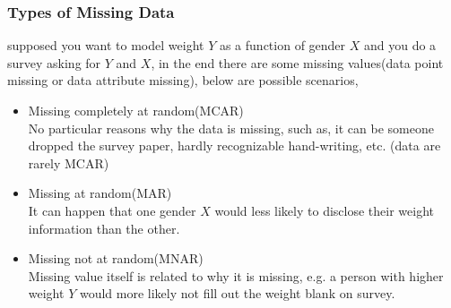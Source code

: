 \documentclass{beamer}
\begin{document}
\begin{frame}
\frametitle{Types of Missing Data}

supposed you want to model weight $Y$ as a function of gender $X$ and you do a survey asking for $Y$ and $X$, in the end there are some missing values(data point missing or data attribute missing), below are possible scenarios,
\begin{itemize}
\item{Missing completely at random(MCAR)}\\
No particular reasons why the data is missing, such as, it can be someone dropped the survey paper, hardly recognizable hand-writing, etc. (data are rarely MCAR) 
\item{Missing at random(MAR)}\\
It can happen that one gender $X$ would less likely to disclose their weight information than the other.
\item{Missing not at random(MNAR)}\\
Missing value itself is related to why it is missing, e.g. a person with higher weight $Y$ would more likely not fill out the weight blank on survey. 
\end{itemize}
\end{frame}

\end{document}
